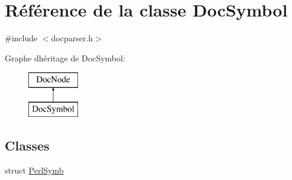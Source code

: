 \hypertarget{class_doc_symbol}{}\section{Référence de la classe Doc\+Symbol}
\label{class_doc_symbol}


{\ttfamily \#include $<$docparser.\+h$>$}

Graphe d\textquotesingle{}héritage de Doc\+Symbol\+:\begin{figure}[H]
\begin{center}
\leavevmode
\includegraphics[height=2.000000cm]{class_doc_symbol}
\end{center}
\end{figure}
\subsection*{Classes}
\begin{DoxyCompactItemize}
\item 
struct \hyperlink{struct_doc_symbol_1_1_perl_symb}{Perl\+Symb}
\end{DoxyCompactItemize}
